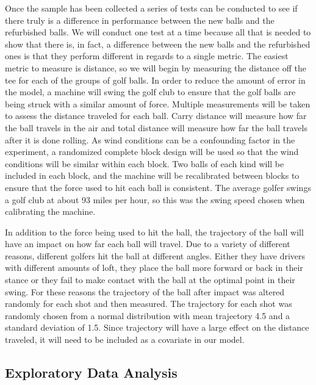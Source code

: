 \documentclass{article}\usepackage[]{graphicx}\usepackage[]{color}
\begin{document}
Once the sample has been collected a series of tests can be conducted to see if there truly is a difference in performance between the new balls and the refurbished balls. We will conduct one test at a time because all that is needed to show that there is, in fact, a difference between the new balls and the refurbished ones is that they perform different in regards to a single metric. The easiest metric to measure is distance, so we will begin by measuring the distance off the tee for each of the groups of golf balls. In order to reduce the amount of error in the model, a machine will swing the golf club to ensure that the golf balls are being struck with a similar amount of force. Multiple measurements will be taken to assess the distance traveled for each ball. Carry distance will measure how far the ball travels in the air and total distance will measure how far the ball travels after it is done rolling. As wind conditions can be a confounding factor in the experiment, a randomized complete block design will be used so that the wind conditions will be similar within each block. Two balls of each kind will be included in each block, and the machine will be recalibrated between blocks to ensure that the force used to hit each ball is consistent. The average golfer swings a golf club at about 93 miles per hour, so this was the swing speed chosen when calibrating the machine.

In addition to the force being used to hit the ball, the trajectory of the ball will have an impact on how far each ball will travel. Due to a variety of different reasons, different golfers hit the ball at different angles. Either they have drivers with different amounts of loft, they place the ball more forward or back in their stance or they fail to make contact with the ball at the optimal point in their swing. For these reasons the trajectory of the ball after impact was altered randomly for each shot and then measured. The trajectory for each shot was randomly chosen from a normal distribution with mean trajectory 4.5 and a standard deviation of 1.5. Since trajectory will have a large effect on the distance traveled, it will need to be included as a covariate in our model. 

\subsection*{Exploratory Data Analysis}
\end{document}

